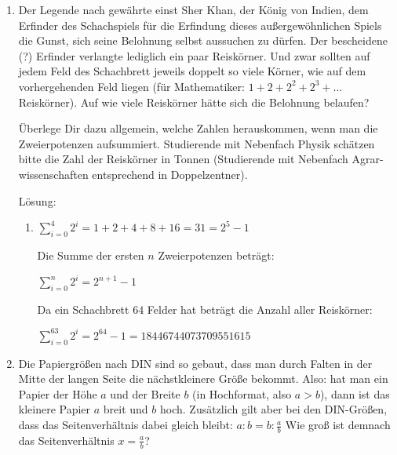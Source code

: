 \documentclass[../main.tex]{subfiles}
\begin{document}
\begin{enumerate}
	\item Der Legende nach gewährte einst Sher Khan, der König von Indien, dem Erfinder des Schachspiels für
	      die Erfindung dieses außergewöhnlichen Spiels die Gunst, sich seine Belohnung selbst aussuchen zu dürfen.
	      Der bescheidene (?) Erfinder verlangte lediglich ein paar Reiskörner.
	      Und zwar sollten auf jedem Feld des Schachbrett jeweils doppelt so viele Körner,
	      wie auf dem vorhergehenden Feld liegen (für Mathematiker:
	      \(
	      1 + 2 + 2^2 + 2^3 + \dots
	      \)
	      Reiskörner). Auf wie viele Reiskörner hätte sich die Belohnung belaufen?

	      Überlege Dir dazu allgemein, welche Zahlen herauskommen, wenn man die
	      Zweierpotenzen aufsummiert. Studierende mit Nebenfach Physik schätzen
	      bitte die Zahl der Reiskörner in Tonnen (Studierende mit Nebenfach Agrar-
	      wissenschaften entsprechend in Doppelzentner).

	      Lösung:
	      \begin{enumerate}
		      \item
		            \(
		            \sum_{i=0}^{4} 2^i = 1 + 2 + 4 + 8 + 16 = 31 = 2^5 - 1
		            \)

		            Die Summe der ersten
		            \( n \)
		            Zweierpotenzen beträgt:

		            \(
		            \sum_{i=0}^{n} 2^i = 2^{n+1} - 1
		            \)

		            Da ein Schachbrett \(
		            64
		            \) Felder hat beträgt die Anzahl aller Reiskörner:

		            \(
		            \sum_{i=0}^{63} 2^i = 2^{64} - 1 = 18446744073709551615
		            \)
	      \end{enumerate}
	\item Die Papiergrößen nach DIN sind so gebaut, dass man durch Falten in der
	      Mitte der langen Seite die nächstkleinere Größe bekommt. Also: hat man ein
	      Papier der  Höhe \( a \)
	      und der Breite
	      \(
	      b
	      \)
	      (in Hochformat, also \(
	      a > b
	      \)),
	      dann ist
	      das kleinere Papier \(
	      a
	      \) breit und \(
	      b
	      \) hoch. Zusätzlich gilt aber bei den DIN-Größen,
	      dass das Seitenverhältnis dabei gleich bleibt:
	      \(
	      a : b = b : \frac{a}{b}
	      \) Wie groß ist demnach das Seitenverhältnis
	      \(
	      x = \frac{a}{b}
	      \)?


\end{enumerate}
\end{document}
